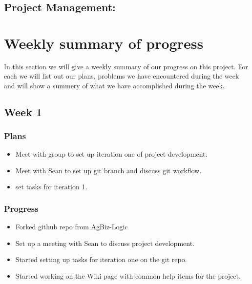 \documentclass[onecolumn, draftclsnofoot,10pt, compsoc]{article}
\begin{document}
		\begin{lstlisting}
		
		\end{lstlisting}
		
		\subsection{Project Management:}
	
\section{Weekly summary of progress}
	   In this section we will give a weekly summary of our progress on this project. For each we will list out our plans, problems we have encountered during the week and will show a summery of what we have accomplished during the week.\\

		\subsection{Week 1}
			\subsubsection{Plans}
				\begin{itemize}
					\item Meet with group to set up iteration one of project development.
					\item Meet with Sean to set up git branch and discuss git workflow.
					\item set tasks for iteration 1.
				\end{itemize}

			\subsubsection{Progress}
				\begin{itemize}
					\item Forked github repo from AgBiz-Logic
					\item Set up a meeting with Sean to discuss project development.
					\item Started setting up tasks for iteration one on the git repo.
					\item Started working on the Wiki page with common help items for the project.
				\end{itemize}
\end{document}
